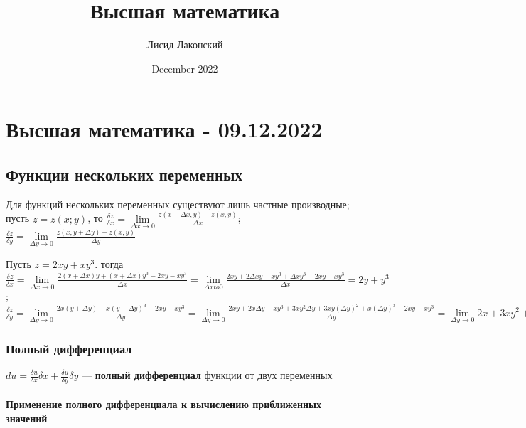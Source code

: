 \documentclass{article}
\title{Высшая математика}
\author{Лисид Лаконский}
\date{December 2022}
\begin{document}
\maketitle

\tableofcontents
\pagebreak

\section{Высшая математика - 09.12.2022}

\subsection{Функции нескольких переменных}

\begin{flushleft}

Для функций нескольких переменных существуют лишь частные производные; пусть $z = z(x; y)$, то $\frac{\delta z}{\delta x} = \lim\limits_{\Delta x \to 0} \frac{z(x + \Delta x, y) - z(x, y)}{\Delta x}$; $\frac{\delta z}{\delta y} = \lim\limits_{\Delta y \to 0} \frac{z(x, y + \Delta y) - z(x, y)}{\Delta y}$

\hfill

Пусть $z = 2xy + xy^3$. тогда $\frac{\delta z}{\delta x} = \lim\limits_{\Delta x \to 0} \frac{2(x + \Delta x)y + (x + \Delta x)y^3 - 2xy - xy^3}{\Delta x} = \lim\limits_{\Delta x to 0} \frac{2xy + 2 \Delta x y + xy^3 + \Delta x y^3 - 2xy - xy^3}{\Delta x} = 2y + y^3$; $\frac{\delta z}{\delta y} = \lim\limits_{\Delta y \to 0} \frac{2x(y + \Delta y) + x(y + \Delta y)^3 - 2xy - xy^3}{\Delta y} = \lim\limits_{\Delta y \to 0} \frac{2xy + 2x \Delta y + xy^3 + 3xy^2 \Delta y + 3xy (\Delta y)^2 + x (\Delta y)^3 - 2xy - xy^3}{\Delta y} = \lim\limits_{\Delta y \to 0} 2x + 3xy^2 + 3xy \Delta y + x (\Delta y)^2 = 2x + 3xy^2$

\subsubsection{Полный дифференциал}

$du = \frac{\delta u}{\delta x} \delta x + \frac{\delta u}{\delta y} \delta y$ — \textbf{полный дифференциал} функции от двух переменных

\paragraph{Применение полного дифференциала к вычислению приближенных значений}


\end{flushleft}
\end{document}
